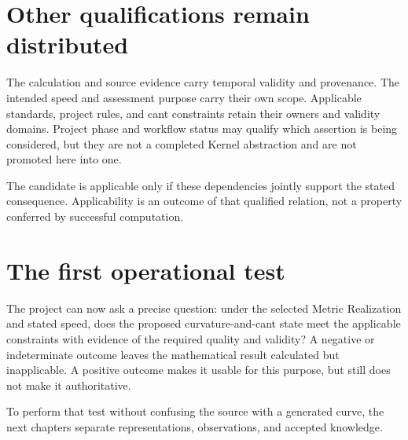 \section{Other qualifications remain distributed}

The calculation and source evidence carry temporal validity and provenance.
The intended speed and assessment purpose carry their own scope. Applicable
standards, project rules, and cant constraints retain their owners and validity
domains. Project phase and workflow status may qualify which assertion is
being considered, but they are not a completed Kernel abstraction and are not
promoted here into one.

The candidate is applicable only if these dependencies jointly support the
stated consequence. Applicability is an outcome of that qualified relation,
not a property conferred by successful computation.

\section{The first operational test}

The project can now ask a precise question: under the selected Metric
Realization and stated speed, does the proposed curvature-and-cant state meet
the applicable constraints with evidence of the required quality and
validity? A negative or indeterminate outcome leaves the mathematical result
calculated but inapplicable. A positive outcome makes it usable for this
purpose, but still does not make it authoritative.

To perform that test without confusing the source with a generated curve, the
next chapters separate representations, observations, and accepted knowledge.
